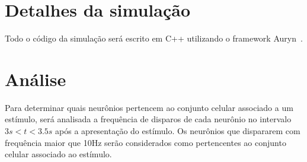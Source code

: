 \section{Detalhes da simulação}

Todo o código da simulação será escrito em C++ utilizando o framework Auryn~\cite{zenkeLimits2014}.

\section{Análise}

Para determinar quais neurônios pertencem ao conjunto celular associado a um estímulo, será analisada a frequência de disparos de
cada neurônio no intervalo $3s < t < 3.5s$ após a apresentação do estímulo. Os neurônios que dispararem com frequência maior que
10Hz serão considerados como pertencentes ao conjunto celular associado ao estímulo.


